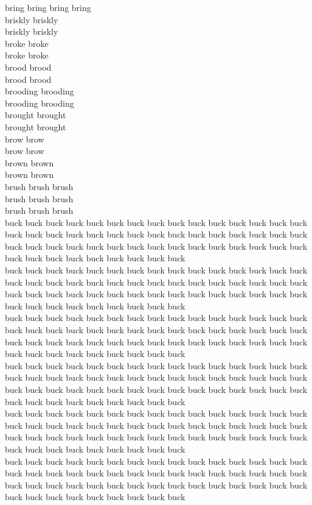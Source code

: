 bring bring bring bring\\
briskly briskly\\
briskly briskly\\
broke broke\\
broke broke\\
brood brood\\
brood brood\\
brooding brooding\\
brooding brooding\\
brought brought\\
brought brought\\
brow brow\\
brow brow\\
brown brown\\
brown brown\\
brush brush brush\\
brush brush brush\\
brush brush brush\\
buck buck buck buck buck buck buck buck buck buck buck buck buck buck buck buck buck buck buck buck buck buck buck buck buck buck buck buck buck buck buck buck buck buck buck buck buck buck buck buck buck buck buck buck buck buck buck buck buck buck buck buck buck buck\\
buck buck buck buck buck buck buck buck buck buck buck buck buck buck buck buck buck buck buck buck buck buck buck buck buck buck buck buck buck buck buck buck buck buck buck buck buck buck buck buck buck buck buck buck buck buck buck buck buck buck buck buck buck buck\\
buck buck buck buck buck buck buck buck buck buck buck buck buck buck buck buck buck buck buck buck buck buck buck buck buck buck buck buck buck buck buck buck buck buck buck buck buck buck buck buck buck buck buck buck buck buck buck buck buck buck buck buck buck buck\\
buck buck buck buck buck buck buck buck buck buck buck buck buck buck buck buck buck buck buck buck buck buck buck buck buck buck buck buck buck buck buck buck buck buck buck buck buck buck buck buck buck buck buck buck buck buck buck buck buck buck buck buck buck buck\\
buck buck buck buck buck buck buck buck buck buck buck buck buck buck buck buck buck buck buck buck buck buck buck buck buck buck buck buck buck buck buck buck buck buck buck buck buck buck buck buck buck buck buck buck buck buck buck buck buck buck buck buck buck buck\\
buck buck buck buck buck buck buck buck buck buck buck buck buck buck buck buck buck buck buck buck buck buck buck buck buck buck buck buck buck buck buck buck buck buck buck buck buck buck buck buck buck buck buck buck buck buck buck buck buck buck buck buck buck buck\\
